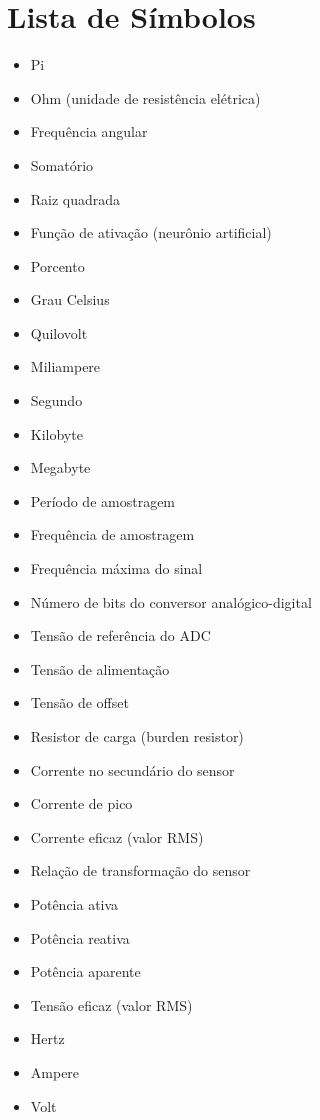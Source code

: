 \chapter*{Lista de Símbolos}
\thispagestyle{empty} %

\begin{itemize}
  \item[$\pi$] \qquad  Pi
  \item[$\Omega$] \qquad  Ohm (unidade de resistência elétrica)
  \item[$\omega$] \qquad  Frequência angular
  \item[$\Sigma$] \qquad  Somatório
  \item[$\sqrt{\ }$] \qquad  Raiz quadrada
  \item[$\varphi$] \qquad  Função de ativação (neurônio artificial)
  \item[$\%$] \qquad  Porcento
  \item[$^{\circ}$C] \qquad  Grau Celsius
  \item[kV] \qquad  Quilovolt
  \item[mA] \qquad  Miliampere
  \item[s] \qquad  Segundo
  \item[KB] \qquad  Kilobyte
  \item[MB] \qquad  Megabyte
  \item[$T$] \qquad  Período de amostragem
  \item[$f_s$] \qquad  Frequência de amostragem
  \item[$f_{max}$] \qquad  Frequência máxima do sinal
  \item[$n$] \qquad  Número de bits do conversor analógico-digital
  \item[$V_{ref}$] \qquad  Tensão de referência do ADC
  \item[$V_{cc}$] \qquad  Tensão de alimentação
  \item[$V_{offset}$] \qquad  Tensão de offset
  \item[$R_{burden}$] \qquad  Resistor de carga (burden resistor)
  \item[$I_s$] \qquad  Corrente no secundário do sensor
  \item[$I_{pico}$] \qquad  Corrente de pico
  \item[$I_{RMS}$] \qquad  Corrente eficaz (valor RMS)
  \item[$N$] \qquad  Relação de transformação do sensor
  \item[$P$] \qquad  Potência ativa
  \item[$Q$] \qquad  Potência reativa
  \item[$S$] \qquad  Potência aparente
  \item[$V_{RMS}$] \qquad  Tensão eficaz (valor RMS)
    \item[Hz] \qquad  Hertz
  \item[A] \qquad  Ampere
  \item[V] \qquad  Volt
\end{itemize}